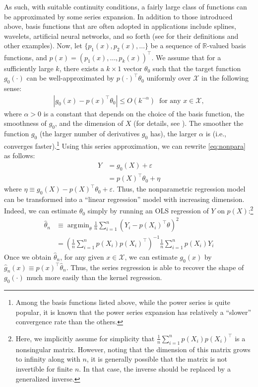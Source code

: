 \documentclass[10.5pt, A4paper, openany, uplatex]{book}
\newcommand{\mcl}{\mathcal}
\newcommand{\eps}{\varepsilon}
\renewcommand{\hat}{\widehat}
\numberwithin{equation}{section}
\DeclareMathOperator*{\argmin}{\arg\!\min}
\begin{document}
As such, with suitable continuity conditions, a fairly large class of functions can be approximated by some series expansion.
In addition to those introduced above, basis functions that are often adopted in applications include splines, wavelets, artificial neural networks, and so forth (see \cite{chen2007large} for their definitions and other examples).
Now, let $\{p_1(x), p_2(x), \ldots \}$ be a sequence of $\mathbb{R}$-valued basis functions, and $p(x) = (p_1(x), \ldots , p_k(x))^\top$.
We assume that for a sufficiently large $k$, there exists a $k \times 1$ vector $\theta_0$ such that the target function $g_0(\cdot)$ can be well-approximated by $p(\cdot)^\top\theta_0$ uniformly over $\mcl{X}$ in the following sense:
\begin{align*}
	|g_0(x) - p(x)^\top\theta_0 | \le O(k^{-\alpha}) \;\; \text{for any $x \in \mcl{X}$},
\end{align*}
where $\alpha > 0$ is a constant that depends on the choice of the basis function, the smoothness of $g_0$, and the dimension of $X$ (for details, see \cite{chen2007large}).
The smoother the function $g_0$ (the larger number of derivatives $g_0$ has), the larger $\alpha$ is (i.e., converges faster).\footnote{
	Among the basis functions listed above, while the power series is quite popular, it is known that the power series expansion has relatively a ``slower'' convergence rate than the others.
}
Using this series approximation, we can rewrite \eqref{eq:nonpara} as follows:
\begin{align*}
	Y
	& = g_0(X) + \eps\\
	& = p(X)^\top\theta_0 + \eta
\end{align*}
where $\eta \equiv g_0(X) - p(X)^\top\theta_0 + \eps$.
Thus, the nonparametric regression model can be transformed into a ``linear regression'' model with increasing dimension.
Indeed, we can estimate $\theta_0$ simply by running an OLS regression of $Y$ on $p(X)$:\footnote{
	Here, we implicitly assume for simplicity that $\frac{1}{n}\sum_{i = 1}^n p(X_i)p(X_i)^\top$ is a nonsingular matrix.
	However, noting that the dimension of this matrix grows to infinity along with $n$, it is generally possible that the matrix is not invertible for finite $n$.
	In that case, the inverse should be replaced by a generalized inverse.
	}
\begin{align*}
	\hat \theta_n 
	& \equiv \argmin_\theta \frac{1}{n}\sum_{i = 1}^n (Y_i -  p(X_i)^\top\theta)^2 \\
	& = \left(\frac{1}{n}\sum_{i = 1}^n p(X_i)p(X_i)^\top\right)^{-1}\frac{1}{n}\sum_{i = 1}^n p(X_i)Y_i
\end{align*}
Once we obtain $\hat \theta_n$, for any given $x \in \mcl{X}$, we can estimate $g_0(x)$ by $\hat g_n(x)  \equiv p(x)^\top \hat \theta_n$.
Thus, the series regression is able to recover the shape of $g_0(\cdot)$ much more easily than the kernel regression.
\end{document}
